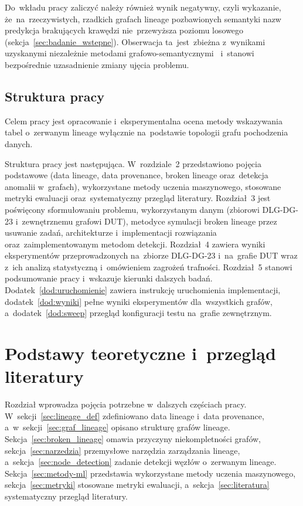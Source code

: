 \documentclass[polish,master,a4paper,oneside]{ppfcmthesis}
\renewcommand{\_}{\origtextunderscore\ifmmode\else\allowbreak\fi}
\begin{document}
Do~wkładu pracy zaliczyć należy również wynik negatywny, czyli wykazanie,
że~na~rzeczywistych, rzadkich grafach lineage pozbawionych semantyki nazw
predykcja brakujących krawędzi nie~przewyższa poziomu losowego
(sekcja~\ref{sec:badanie_wstepne}). Obserwacja ta~jest~zbieżna z~wynikami
uzyskanymi niezależnie metodami grafowo-semantycznymi~\cite{Dutkiewicz2026}
i~stanowi bezpośrednie uzasadnienie zmiany ujęcia problemu.

\section{Struktura pracy}

Celem pracy jest opracowanie i~eksperymentalna ocena metody wskazywania tabel
o~zerwanym lineage wyłącznie na~podstawie topologii grafu pochodzenia danych.

Struktura pracy jest następująca. W~rozdziale~2 przedstawiono pojęcia
podstawowe (data lineage, data provenance, broken lineage oraz~detekcja
anomalii w~grafach), wykorzystane metody uczenia maszynowego, stosowane
metryki ewaluacji oraz~systematyczny przegląd literatury. Rozdział~3
jest poświęcony sformułowaniu problemu, wykorzystanym danym (zbiorowi
DLG-DG-23 i~zewnętrznemu grafowi DUT), metodyce symulacji broken lineage
przez usuwanie zadań, architekturze i~implementacji rozwiązania oraz~zaimplementowanym
metodom detekcji. Rozdział~4 zawiera wyniki eksperymentów przeprowadzonych
na~zbiorze DLG-DG-23 i~na~grafie DUT wraz z~ich analizą statystyczną
i~omówieniem zagrożeń trafności. Rozdział~5 stanowi podsumowanie pracy i~wskazuje kierunki dalszych
badań. Dodatek~\ref{dod:uruchomienie} zawiera instrukcję uruchomienia
implementacji, dodatek~\ref{dod:wyniki} pełne wyniki eksperymentów
dla~wszystkich grafów, a~dodatek~\ref{dod:sweep} przegląd konfiguracji
testu na~grafie zewnętrznym.

\chapter{Podstawy teoretyczne i~przegląd literatury}

Rozdział wprowadza pojęcia potrzebne w~dalszych częściach pracy.
W~sekcji~\ref{sec:lineage_def} zdefiniowano data lineage i~data provenance,
a~w~sekcji~\ref{sec:graf_lineage} opisano strukturę grafów lineage.
Sekcja~\ref{sec:broken_lineage} omawia przyczyny niekompletności grafów,
sekcja~\ref{sec:narzedzia} przemysłowe narzędzia zarządzania lineage,
a~sekcja~\ref{sec:node_detection} zadanie detekcji węzłów o~zerwanym lineage.
Sekcja~\ref{sec:metody-ml} przedstawia wykorzystane metody uczenia
maszynowego, sekcja~\ref{sec:metryki} stosowane metryki ewaluacji,
a~sekcja~\ref{sec:literatura} systematyczny przegląd literatury.
\end{document}
